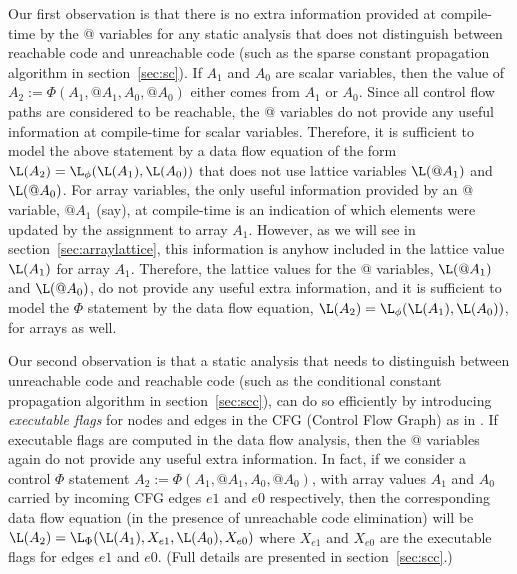 Our first observation is that there is no extra information
provided at compile-time by the @ variables
for any static analysis that does not distinguish between reachable code
and unreachable code (such as the sparse constant propagation
algorithm in section~\ref{sec:sc}).
If $A_1$ and $A_0$ are scalar variables, then the value of 
$A_2 := \Phi(A_1, @A_1, A_0, @A_0)$
either comes from $A_1$ or $A_0$.  Since all control flow paths are
considered to be reachable, the @ variables do not provide any
useful information at compile-time for scalar variables.  Therefore,
it is sufficient to model
the above statement by
a data flow equation of the form $\L(A_2) = \L_{\phi}(\L(A_1), \L(A_0))$
that does not use lattice variables $\L(@A_1)$ and $\L(@A_0)$.
For array variables, the only useful information
provided by an @ variable, $@A_1$ (say), at compile-time is an indication
of which elements were updated by the assignment to array $A_1$.  
However, as we will see in section~\ref{sec:arraylattice}, this information
is anyhow included in the lattice value $\L(A_1)$ for array $A_1$. 
Therefore, the lattice values for the @ variables, $\L(@A_1)$ and $\L(@A_0)$,
do not provide any useful extra information, and it
is sufficient to model the $\Phi$ statement by the
data flow equation, $\L(A_2) = \L_{\phi}(\L(A_1), \L(A_0))$, for arrays
as well.

Our second observation is that
a static analysis that needs to distinguish between unreachable
code and reachable code (such as the conditional constant propagation
algorithm in section~\ref{sec:scc}), can do so efficiently
by introducing {\it executable flags} for nodes and edges in the
CFG (Control Flow Graph) as in \cite{WeZa91}.
If executable flags are computed in the data flow analysis, then
the @ variables again do not provide any useful extra information.
In fact, if we consider a control $\Phi$ statement
$A_2 := \Phi(A_1, @A_1, A_0, @A_0)$, with array values $A_1$ and $A_0$
carried by incoming CFG edges $e1$ and $e0$ respectively, then
the corresponding data flow equation (in the presence of unreachable code
elimination) will be 
$\L(A_2) = \L_{\Phi}(\L(A_1), X_{e1}, \L(A_0), X_{e0})$ where 
$X_{e1}$ and $X_{e0}$ are the executable flags for edges $e1$ and $e0$.
(Full details are
presented in section~\ref{sec:scc}.)


